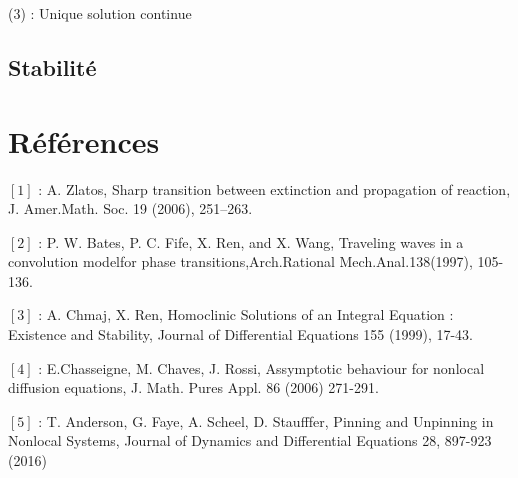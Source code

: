 \documentclass{article}
\begin{document}
(3) : Unique solution continue

\subsection{Stabilité}


\section{Références}

\noindent $[1]$ : A.  Zlatos,  Sharp  transition  between  extinction  and  propagation  of  reaction,  J.  Amer.Math. Soc. 19 (2006), 251–263.\newline

\noindent $[2]$ : P.  W.  Bates,  P.  C.  Fife,  X.  Ren,  and  X.  Wang,  Traveling  waves  in  a  convolution  modelfor phase  transitions,Arch.Rational  Mech.Anal.138(1997),  105-136. \newline 

\noindent $[3]$ : A. Chmaj, X. Ren, Homoclinic Solutions of an Integral Equation : Existence and Stability, Journal of Differential Equations 155 (1999), 17-43. \newline

\noindent $[4]$ : E.Chasseigne, M. Chaves, J. Rossi, Assymptotic behaviour for nonlocal diffusion equations, J. Math. Pures Appl. 86 (2006) 271-291. \newline	

\noindent $[5]$ : T. Anderson, G. Faye, A. Scheel, D. Staufffer, Pinning and Unpinning in Nonlocal Systems, Journal of Dynamics and Differential Equations 28,   897-923 (2016)
\end{document}
